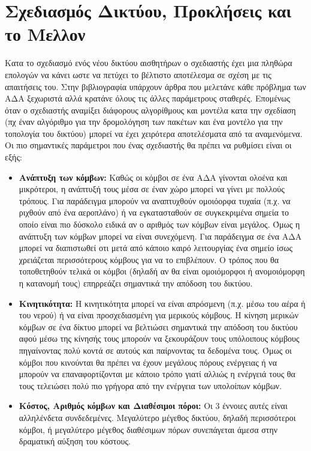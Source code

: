 \section{Σχεδιασμός Δικτύου, Προκλήσεις και το Μελλον}
Κατα το σχεδιασμό ενός νέου δικτύου αισθητήρων ο σχεδιαστής έχει μια πληθώρα επολογών να κάνει ωστε να πετύχει το βέλτιστο αποτέλεσμα σε σχέση με τις απαιτήσεις
του.
Στην βιβλιογραφία υπάρχουν άρθρα που μελετάνε κάθε πρόβλημα των ΑΔΑ ξεχωριστά αλλά κρατάνε όλους τις άλλες παράμετρους σταθερές.
Επομένως όταν ο σχεδιαστής αναμίξει διάφορους αλγορίθμους και μοντέλα κατα την σχεδίαση (πχ έναν αλγόριθμο για την δρομολόγηση των πακέτων και ένα μοντέλο για την
τοπολογία του δικτύου) μπορεί να έχει χειρότερα αποτελέσματα από τα αναμενόμενα.
Οι πιο σημαντικές παράμετροι που ένας σχεδιαστής θα πρέπει να ρυθμίσει είναι οι εξής:
\begin{itemize}
\item \textbf{Ανάπτυξη των κόμβων:} Καθώς οι κόμβοι σε ένα ΑΔΑ γίνονται ολοένα και μικρότεροι, η ανάπτυξή τους μέσα σε έναν χώρο μπορεί να γίνει με πολλούς τρόπους.
Για παράδειγμα μπορούν να αναπτυχθούν ομοιόορφα τυχαία (π.χ. να ριχθούν από ένα αεροπλάνο) ή να εγκατασταθούν σε συγκεκριμένα σημεία το οποίο είναι πιο
δύσκολο ειδικά αν ο αριθμός των κόμβων είναι μεγάλος.
Όμως η ανάπτυξη των κόμβων μπορεί να είναι συνεχόμενη.
Για παράδειγμα σε ένα ΑΔΑ μπορεί να διαπιστωθεί οτι μετά από κάποιο καιρό λειτουργίας ένα σημείο ίσως χρειάζεται περισσότερους κόμβους για να το επιβλέπουν.
Ο τρόπος που θα τοποθετηθούν τελικά οι κόμβοι (δηλαδή αν θα είναι ομοιόμορφοι ή ανομοιόμορφη η κατανομή τους) επηρρεάζει σημαντικά την απόδοση του δικτύου.
\item \textbf{Κινητικότητα:} Η κινητικότητα μπορεί να είναι απρόσμενη (π.χ. μέσω του αέρα ή του νερού) ή να είναι προσχεδιασμένη για μερικούς κόμβους.
Η κίνηση μερικών κόμβων σε ένα δίκτυο μπορεί να βελτιώσει σημαντικά την απόδοση του δικτύου αφού μέσω της κίνησής τους μπορούν να ξεκουράζουν τους υπόλοιπους κόμβους
πηγαίνοντας πολύ κοντά σε αυτούς και παίρνοντας τα δεδομένα τους.
Όμως οι κόμβοι που κινούνται θα πρέπει να έχουν μεγάλους πόρους ενέργειας ή να μπορούν να επαναφορτίζονται με κάποιο τρόπο γιατί αλλιώς η ενέργειά τους θα τους
τελειώσει πολύ πιο γρήγορα από την ενέργεια των υπολοίπων κόμβων.
\item \textbf{Κόστος, Αριθμός κόμβων και Διαθέσιμοι πόροι:} Οι 3 έννοιες αυτές είναι αλληλένδετα συνδεδεμένες.
Μεγαλύτερο μέγεθος δικτύου, δηλαδή περισσότεροι κόμβοι, ή μεγαλύτερο μέγεθος διαθέσιμων πόρων συνεπάγεται άμεσα στην δραματική αύξηση του κόστους.

\end{itemize}
